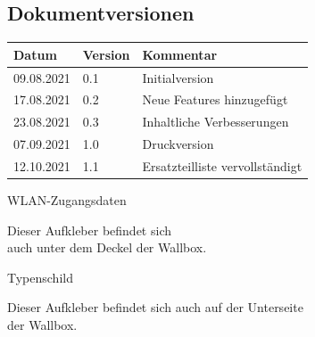 \documentclass[a4paper,10pt]{article}
\begin{document}
\begin{multicols*}{2}
	\section{Dokumentversionen}
	\begin{tabular}{lll}
		\toprule
		Datum      & Version & Kommentar                       \\
		\midrule
		09.08.2021 & 0.1     & Initialversion                  \\
		17.08.2021 & 0.2     & Neue Features hinzugefügt       \\
		23.08.2021 & 0.3     & Inhaltliche Verbesserungen      \\
		07.09.2021 & 1.0     & Druckversion                    \\
		12.10.2021 & 1.1     & Ersatzteilliste vervollständigt \\
		\bottomrule
	\end{tabular}
	\newpage
	\pagestyle{empty}
	\null
	\newpage
	\null
	\vfill
	WLAN-Zugangsdaten
	\begin{tcolorbox}[width=4.2cm,height=2.7cm, boxrule=0.25mm]

	\end{tcolorbox}
	Dieser Aufkleber befindet sich\\ auch unter dem Deckel der Wallbox.
	\columnbreak

	\null
	\vfill
	Typenschild
	\begin{tcolorbox}[width=7.8cm,height=4.1cm, boxrule=0.25mm]

	\end{tcolorbox}
	Dieser Aufkleber befindet sich auch auf der Unterseite\\ der Wallbox.
\end{multicols*}
\end{document}
